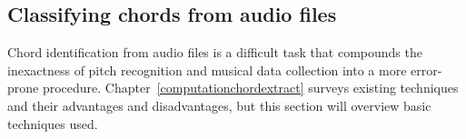 \subsection{Classifying chords from audio files}

Chord identification from audio files is a difficult task that compounds the inexactness of pitch recognition and musical data collection into a more error-prone procedure. Chapter~\ref{computationchordextract} surveys existing techniques and their advantages and disadvantages, but this section will overview basic techniques used.